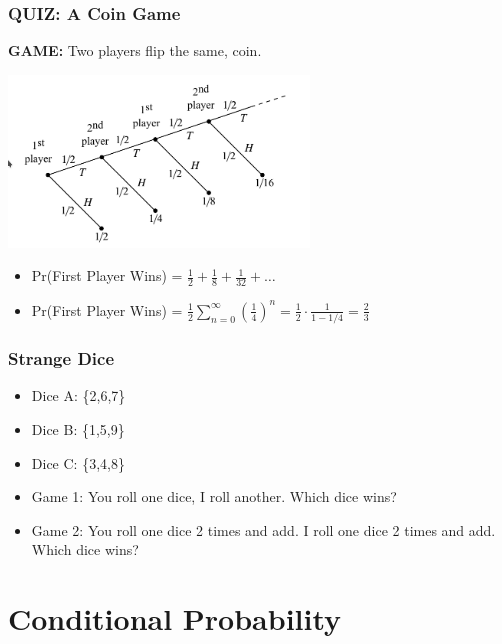 \documentclass{beamer}
\begin{document}
\begin{frame}
  \frametitle{QUIZ: A Coin Game}

  {\large
    {\bf GAME:} Two players flip the same,  coin.

    \begin{center}
      \includegraphics[width=0.6\textwidth]{../img/coin_tree}
    \end{center}

    \begin{itemize}
    \item<2-> Pr(First Player Wins) = $\frac{1}{2} + \frac{1}{8} + \frac{1}{32} + \ldots$
    \item<3-> Pr(First Player Wins) =
      $\frac{1}{2}\sum_{n=0}^{\infty}(\frac{1}{4})^n =
      \frac{1}{2}\cdot\frac{1}{1-1/4} = \frac{2}{3}$
    \end{itemize}
  }
\end{frame}

\begin{frame}
  \frametitle{Strange Dice}

  {\large

    \begin{itemize}
    \item Dice A: \{2,6,7\}
    \item Dice B: \{1,5,9\}
    \item Dice C: \{3,4,8\}
    \end{itemize}

    \begin{itemize}
    \item Game 1: You roll one dice, I roll another. Which dice wins?
    \item Game 2: You roll one dice 2 times and add. I roll one dice 2
      times and add. Which dice wins?
    \end{itemize}
  }

\end{frame}

\section{Conditional Probability}
\end{document}
